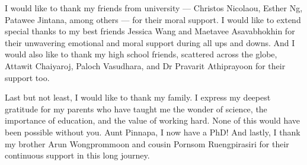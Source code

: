 {  I would like to thank my friends from university --- Christos Nicolaou, Esther Ng, Patawee Jintana, among others --- for their moral support.
  I would like to extend special thanks to my best friends Jessica Wang and Maetavee Asavabhokhin for their unwavering emotional and moral support during all ups and downs.
  And I would also like to thank my high school friends, scattered across the globe, Attawit Chaiyaroj, Paloch Vasudhara, and Dr Pravarit Athiprayoon for their support too.

  Last but not least, I would like to thank my family.
  I express my deepest gratitude for my parents who have taught me the wonder of science, the importance of education, and the value of working hard.
  None of this would have been possible without you.
  Aunt Pinnapa, I now have a PhD!
  And lastly, I thank my brother Arun Wongprommoon and cousin Pornsom Ruengpirasiri for their continuous support in this long journey.
}






